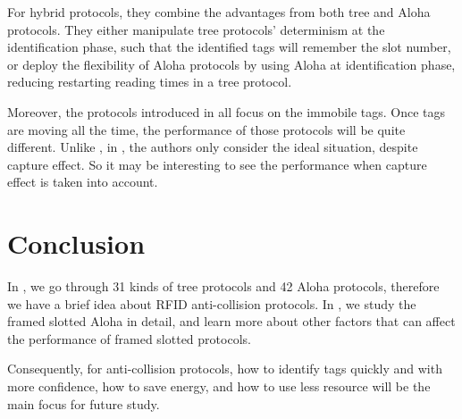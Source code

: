 \documentclass[12pt,letterpaper]{article}
\begin{document}
For hybrid protocols, they combine the advantages from both tree and
Aloha protocols. They either manipulate tree protocols' determinism at
the identification phase, such that the identified tags will remember
the slot number, or deploy the flexibility of Aloha protocols by using
Aloha at identification phase, reducing restarting reading times in a
tree protocol.

Moreover, the protocols introduced in \cite{survey} all focus on the 
immobile tags. Once tags are moving all the time, the performance
of those protocols will be quite different. Unlike \cite{frame}, in
\cite{survey}, the authors only consider the ideal situation, despite
capture effect. So it may be interesting to see the performance 
when capture effect is taken into account.

\section{Conclusion}
In \cite{survey}, we go through 31 kinds of tree protocols and 42
Aloha protocols, therefore we have a brief idea about RFID anti-collision
protocols. In \cite{frame}, we study the framed slotted Aloha 
in detail, and learn more about other factors that can affect the 
performance of framed slotted protocols. 

Consequently, for anti-collision protocols, how to identify tags 
quickly and with more confidence, how to save energy, and 
how to use less resource will be the main focus for future study.

 
\end{document}
